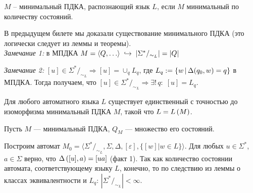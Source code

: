 





\Def $M$ -- минимальный ПДКА, распознающий язык $L$, если $M$ минимальный по количеству состояний.

В предыдущем билете мы доказали существование минимального ПДКА (это логически следует из леммы и теоремы).\\

\textit{Замечание 1:} в МПДКА $M = \langle Q, \ldots \rangle \; \hookrightarrow \; \arrowvert \Sigma^* /_{\sim_L} \arrowvert = \arrowvert Q \arrowvert$

\textit{Замечание 2:} $[u] \in \Sigma^* /_{\sim_L} \Longrightarrow [u] = \cup_{q}{L_q}$, где $L_q := \{w \,\arrowvert\, \Delta(q_0, w) = q\}$ в МПДКА. Тогда получаем, что $[u] \in \Sigma^* /_{\sim_L} \Longrightarrow \exists!\, q :\; [u]=L_q$.

\Th Для любого автоматного языка $L$ существует единственный с точностью до изоморфизма минимальный ПДКА $M$, такой что $L = L \left({M}\right)$.

\Proof Пусть $M$ — минимальный ПДКА, $Q_M$ — множество его состояний.

Построим автомат $M_0 = \langle \Sigma^* /_{\sim_L}, \Sigma, \Delta, [\varepsilon], \{ [w] | w \in L \} \rangle$. Для любых $u \in \Sigma^*$, $a \in \Sigma$ верно, что $\Delta \left({[u], a}\right) = [ua]$ (факт 1). Так как количество состоянии автомата, соответствующему языку $L$, конечно, то по следствию из леммы о классах эквивалентности и $L_q$: $|\Sigma^* /_{\sim_L}| < \infty$. 

